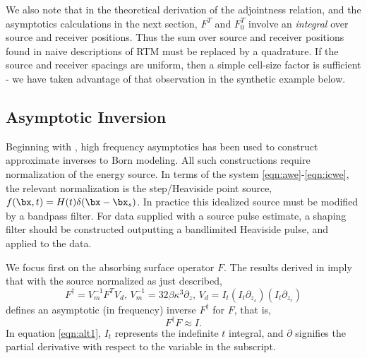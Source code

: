 We also note that in the theoretical derivation of the adjointness
relation, and the asymptotics calculations in the next section,
$F^T$ and $F_0^T$ involve an {\em integral} over source and
receiver positions. Thus the sum over source and receiver positions
found in naive descriptions of RTM must be replaced by a
quadrature. If the source and receiver spacings are uniform, then a
simple cell-size factor is sufficient - we have taken advantage of
that observation in the synthetic example below.

\subsection{Asymptotic Inversion}
Beginning with \cite{CohBlei:77}, high frequency asymptotics has been
used to construct approximate inverses to Born modeling. All such
constructions require normalization of the energy source. In terms of
the system \ref{eqn:awe}-\ref{eqn:icwe}, the relevant normalization is
the step/Heaviside point source, $f(\bx,t) =
H(t)\delta(\bx-\bx_s)$. In practice this idealized source must be
modified by a bandpass filter. For data supplied with a source pulse
estimate, a shaping filter should be constructed outputting a
bandlimited Heaviside pulse, and applied to the data.

We focus first on the absorbing surface operator
$F$. The results derived in \cite{HouSymes:17} imply that with the source normalized as just
described,
\begin{equation}
\label{eqn:alt1}
F^{\dagger} = V_m^{-1}F^TV_d,\, V_m^{-1}= 32\beta \kappa^3 \partial_z,\, 
V_d = I_t (I_t\partial_{z_s})(I_t\partial_{z_r}) 
\end{equation}
defines an asymptotic (in frequency) inverse $F^{\dagger}$ for $F$,
that is,
\begin{equation}
\label{eqn:appinv}
F^{\dagger}F \approx I.
\end{equation}
In equation
\ref{eqn:alt1}, $I_t$ represents the indefinite $t$ integral, and
$\partial$ signifies the partial derivative with respect to the
variable in the subscript.

